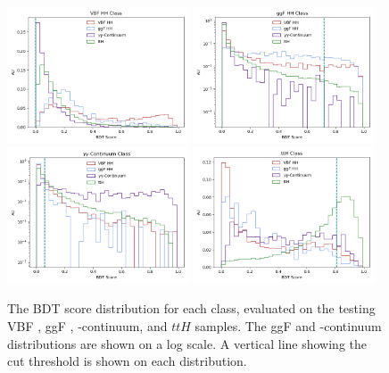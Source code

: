 \begin{figure}[!h]
  \centering
  \includegraphics[width=0.48\textwidth]{chapters/chapter6_vbf/images/bdt_scores/vbf_scores.png}
  \includegraphics[width=0.48\textwidth]{chapters/chapter6_vbf/images/bdt_scores/log_ggf_scores.png}
  \includegraphics[width=0.48\textwidth]{chapters/chapter6_vbf/images/bdt_scores/log_yy_scores.png}
  \includegraphics[width=0.48\textwidth]{chapters/chapter6_vbf/images/bdt_scores/tth_scores.png}
  \caption[The \gls{BDT} score distribution for each class, evaluated on the VBF \HH, ggF \HH, \yy-continuum, and $ttH$ samples]{The \gls{BDT} score distribution for each class, evaluated on the testing VBF \HH, ggF \HH, \yy-continuum, and $ttH$ samples. The ggF \HH and \yy-continuum distributions are shown on a log scale. A vertical line showing the cut threshold is shown on each distribution.}
  \label{fig:bdt-scores}
\end{figure}

